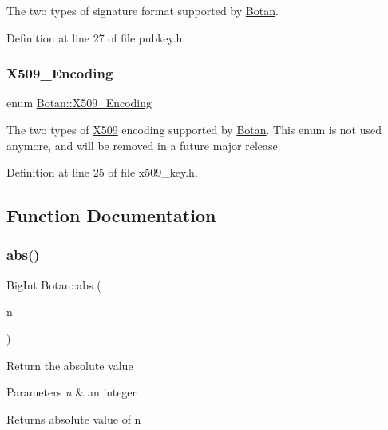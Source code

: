 The two types of signature format supported by \mbox{\hyperlink{namespace_botan}{Botan}}. 

Definition at line 27 of file pubkey.\+h.

\mbox{\label{namespace_botan_a53759b4ed1fb93549f307fcf68729d2f}} 
\subsubsection{\texorpdfstring{X509\+\_\+\+Encoding}{X509\_Encoding}}
{\footnotesize\ttfamily enum \mbox{\hyperlink{namespace_botan_a53759b4ed1fb93549f307fcf68729d2f}{Botan\+::\+X509\+\_\+\+Encoding}}}

The two types of \mbox{\hyperlink{namespace_botan_1_1_x509}{X509}} encoding supported by \mbox{\hyperlink{namespace_botan}{Botan}}. This enum is not used anymore, and will be removed in a future major release. 

Definition at line 25 of file x509\+\_\+key.\+h.



\subsection{Function Documentation}
\mbox{\label{namespace_botan_a481ae8e7fe0268600101ab74663f3f16}} 
\subsubsection{\texorpdfstring{abs()}{abs()}}
{\footnotesize\ttfamily Big\+Int Botan\+::abs (\begin{DoxyParamCaption}\item[{const Big\+Int \&}]{n }\end{DoxyParamCaption})\hspace{0.3cm}{\ttfamily [inline]}}

Return the absolute value 
\begin{DoxyParams}{Parameters}
{\em n} & an integer \\
\hline
\end{DoxyParams}
\begin{DoxyReturn}{Returns}
absolute value of n 
\end{DoxyReturn}



